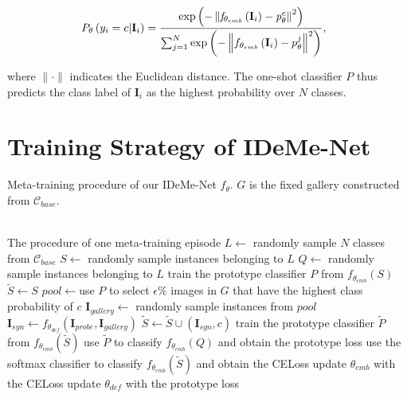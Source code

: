 \documentclass[10pt,letterpaper,twocolumn]{article}
\begin{document}
\noindent 
\begin{equation}
\hspace{-0.1in}
P_{\theta}\left(y_{i}=c\text{\ensuremath{\mid}}\mathbf{I}_{i}\right)=\frac{\mathrm{exp}\left(-\left\Vert \mathit{f}_{\theta_{emb}}\left(\mathbf{I}_{i}\right)-\mathit{p}_{\theta}^{c}\right\Vert^{2} \right)}{\sum_{j=1}^{N}\mathrm{exp}\left(-\left\Vert f_{\theta_{emb}}\left(\mathbf{I}_{i}\right)-p_{\theta}^{j}\right\Vert^{2} \right)},\label{eq:prototypical_classifier}
\end{equation}

\noindent where $\parallel\cdot\parallel$ indicates the Euclidean
distance. The one-shot classifier $P$ thus predicts the class label of
$\mathbf{I}_{i}$ as the highest probability over $N$ classes.

\section{Training Strategy of IDeMe-Net}

\begin{algorithm}    	 
\caption{Meta-training procedure of our IDeMe-Net $f_{\theta}$. $G$ is the fixed gallery constructed from $\mathcal{C}_{base}$.}\label{alg}    \begin{algorithmic}[1]   	  \\The procedure of one meta-training episode	
	 \State $L\gets$ randomly sample $N$ classes from $\mathcal{C}_{base}$       	
	 \State $S\gets$ randomly sample instances belonging to $L$      		
\State $Q\gets$ randomly sample instances belonging to $L$     
     		 \State train the prototype classifier $P$ from $f_{\theta_{emb}}(S)$    		 
\State $\tilde{S}\gets S$        		
\State $pool\gets$use $P$ to select $\epsilon\% $ images in $G$ that have the highest class probability of $c$          		 
\State $\mathbf{I}_{gallery}\gets $ randomly sample instances from $pool$              			 	
\State $\mathbf{I}_{syn}\gets f_{\theta_{def}}(\mathbf{I}_{probe},\mathbf{I}_{gallery})$               			 	
\State $\tilde{S} \gets \tilde{S}\cup (\mathbf{I}_{syn},c)$        
		\EndFor{}  		 
	\EndFor{}       		 
\EndFor{}              	
	\State train the prototype classifier $\tilde{P}$ from $f_{\theta_{emb}}(\tilde{S})$       	 
	\State use $\tilde{P}$ to classify $f_{\theta_{emb}}(Q)$ and obtain the prototype loss       	
	\State use the softmax classifier to classify $f_{\theta_{emb}}(\tilde{S})$ and obtain the CELoss       	
	\State update $\theta_{emb}$ with the CELoss       		
\State update $\theta_{def}$ with the prototype loss                    
	 	\EndProcedure     	
\end{algorithmic} 

\end{algorithm}
\end{document}
